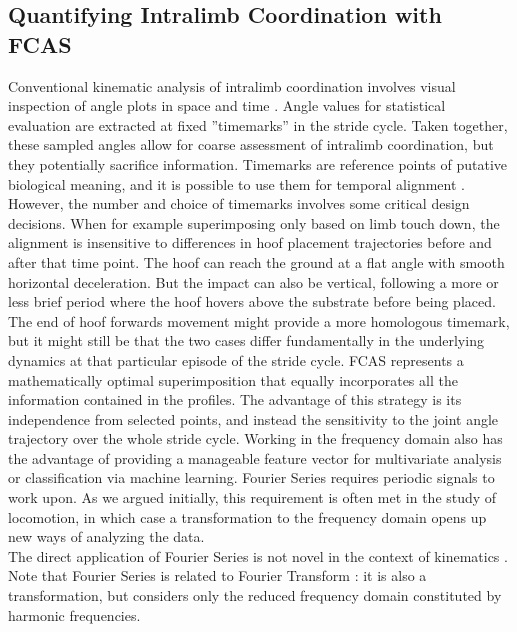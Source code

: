 \subsection{Quantifying Intralimb Coordination with FCAS}
Conventional kinematic analysis of intralimb coordination involves visual inspection of angle plots in space and time \citep{Irschick1999,Fischer2002,Stoessel2012,Schmidt2008,Day2007,Polk2002,Nyakatura2010}.
Angle values for statistical evaluation are extracted at fixed ''timemarks'' in the stride cycle.
Taken together, these sampled angles allow for coarse assessment of intralimb coordination, but they potentially sacrifice information.
Timemarks are reference points of putative biological meaning, and it is possible to use them for temporal alignment \cite[e.g.][]{HsiaoWecksler2010}.
However, the number and choice of timemarks involves some critical design decisions.
When for example superimposing only based on limb touch down, the alignment is insensitive to differences in hoof placement trajectories before and after that time point.
The hoof can reach the ground at a flat angle with smooth horizontal deceleration.
But the impact can also be vertical, following a more or less brief period where the hoof hovers above the substrate before being placed.
The end of hoof forwards movement might provide a more homologous timemark, but it might still be that the two cases differ fundamentally in the underlying dynamics at that particular episode of the stride cycle.
FCAS represents a mathematically optimal superimposition that equally incorporates all the information contained in the profiles.
The advantage of this strategy is its independence from selected points, and instead the sensitivity to the joint angle trajectory over the whole stride cycle.
Working in the frequency domain also has the advantage of providing a manageable feature vector for multivariate analysis or classification via machine learning.
Fourier Series requires periodic signals to work upon.
As we argued initially, this requirement is often met in the study of locomotion, in which case a transformation to the frequency domain opens up new ways of analyzing the data.
\\The direct application of Fourier Series \citep{Fourier1822,Gray1995,Bracewell2000} is not novel in the context of kinematics \cite[e.g.][]{Bernstein1935,Webb2007,Wheat2006}.
Note that Fourier Series is related to Fourier Transform \cite[cf.][]{Bracewell2000,Robertson2018}: it is also a transformation, but considers only the reduced frequency domain constituted by harmonic frequencies.

